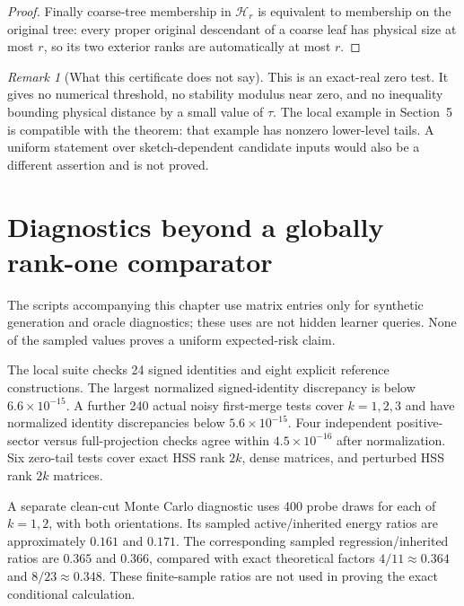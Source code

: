 \documentclass[11pt,oneside,openany,a4paper]{book}
\numberwithin{equation}{chapter}
\theoremstyle{definition}
\theoremstyle{remark}
\newtheorem{remark}[theorem]{Remark}
\newcommand{\HH}{\mathcal H}\newcommand{\SSS}{\mathcal S}
\begin{document}
\begin{proof}
Finally coarse-tree membership in $\HH_r$ is equivalent to membership on the original tree: every proper original descendant of a coarse leaf has physical size at most $r$, so its two exterior ranks are automatically at most $r$.
\end{proof}

\begin{remark}[What this certificate does not say]
This is an exact-real zero test. It gives no numerical threshold, no stability modulus near zero, and no inequality bounding physical distance by a small value of $\tau$. The local example in Section~5 is compatible with the theorem: that example has nonzero lower-level tails. A uniform statement over sketch-dependent candidate inputs would also be a different assertion and is not proved.
\end{remark}

\section{Diagnostics beyond a globally rank-one comparator}
The scripts accompanying this chapter use matrix entries only for synthetic generation and oracle diagnostics; these uses are not hidden learner queries. None of the sampled values proves a uniform expected-risk claim.

The local suite checks 24 signed identities and eight explicit reference constructions. The largest normalized signed-identity discrepancy is below $6.6\times10^{-15}$. A further 240 actual noisy first-merge tests cover $k=1,2,3$ and have normalized identity discrepancies below $5.6\times10^{-15}$. Four independent positive-sector versus full-projection checks agree within $4.5\times10^{-16}$ after normalization. Six zero-tail tests cover exact HSS rank $2k$, dense matrices, and perturbed HSS rank $2k$ matrices.

A separate clean-cut Monte Carlo diagnostic uses 400 probe draws for each of $k=1,2$, with both orientations. Its sampled active/inherited energy ratios are approximately $0.161$ and $0.171$. The corresponding sampled regression/inherited ratios are $0.365$ and $0.366$, compared with exact theoretical factors $4/11\approx0.364$ and $8/23\approx0.348$. These finite-sample ratios are not used in proving the exact conditional calculation.
\end{document}
